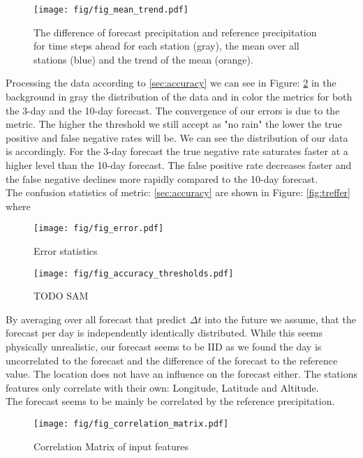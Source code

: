 \documentclass{article}
\theoremstyle{plain}
\theoremstyle{definition}
\theoremstyle{remark}
\begin{document}
\begin{figure}[h]
    \centering
    \label{fig:mean_trend}
    \texttt{[image: fig/fig\_mean\_trend.pdf]}
    \caption{The difference of forecast precipitation and reference precipitation
        for time steps ahead for each station (gray), the mean over all stations (blue)
        and the trend of the mean (orange). }
\end{figure}
Processing the data according to \ref{sec:accuracy} we can see in Figure:
\ref{fig:error} in the background in gray the distribution of the data and in
color the metrics for both the 3-day and the  10-day forecast. The convergence
of our errors is due to the metric. The higher the threshold we still accept as
"no rain" the lower the true positive and false negative rates will be. We can
see the distribution of our data is accordingly. For the 3-day forecast the
true negative rate saturates faster at a higher level than the 10-day forecast.
The false positive rate decreases faster and the false negative declines more
rapidly compared to the 10-day forecast.\\
The confusion statistics of metric: \ref{sec:accuracy} are shown in Figure:
\ref{fig:treffer} where
\begin{figure}[h]
    \centering
    \label{fig:error}
    \texttt{[image: fig/fig\_error.pdf]}
    \caption{Error statistics}
\end{figure}

\begin{figure}[h]
    \centering
    \label{fig:accuracy}
    \texttt{[image: fig/fig\_accuracy\_thresholds.pdf]}
    \caption{TODO SAM}
\end{figure}

By averaging over all forecast that predict $\Delta t$ into the future we
assume, that the forecast per day is independently identically distributed.
While this seems physically unrealistic, our forecast seems to be IID as we
found the day is uncorrelated to the forecast and the difference of the
forecast to the reference value. The location does not have an influence on the
forecast either. The stations features only correlate with their own:
Longitude, Latitude and Altitude. \\
The forecast seems to be mainly be correlated by the reference precipitation.
\begin{figure}[h]
    \centering
    \label{fig:corr_matrix}
    \texttt{[image: fig/fig\_correlation\_matrix.pdf]}
    \caption{Correlation Matrix of input features}
\end{figure}
\end{document}
